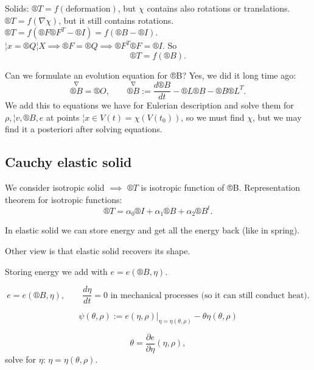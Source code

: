 \documentclass[12pt]{article}					%
\begin{document}
\begin{poznamka}
	Solids: $®T = f(\text{deformation})$, but $\chi$ contains also rotations or translations. $®T = f(\nabla \chi)$, but it still contains rotations. $®T = f(®F ®F^T - ®I) = f(®B - ®I)$. $¦x = ®Q ¦X \implies ®F = ®Q \implies ®F^T ®F = ®I$. So
	$$ ®T = f(®B). $$

	Can we formulate an evolution equation for ®B? Yes, we did it long time ago:
	$$ \overset{\nabla}{®B} = ®O, \qquad \overset{\nabla}{®B} := \frac{d®B}{dt} - ®L®B - ®B®L^T. $$
	We add this to equations we have for Eulerian description and solve them for $\rho, ¦v, ®B, e$ at points $¦x \in V(t) = \chi(V(t_0))$, so we must find $\chi$, but we may find it a posteriori after solving equations.
\end{poznamka}


\subsection{Cauchy elastic solid}
\begin{poznamka}
	We consider isotropic solid $\implies$ $®T$ is isotropic function of ®B. Representation theorem for isotropic functions:
	$$ ®T = \alpha_0®I + \alpha_1 ®B + \alpha_2 ®B^t. $$
\end{poznamka}

\begin{definice}
	In elastic solid we can store energy and get all the energy back (like in spring).

	Other view is that elastic solid recovers its shape.

	Storing energy we add with $e = e(®B, \eta)$.
\end{definice}

\begin{definice}
	$$ e = e(®B, \eta), \qquad \frac{d\eta}{dt} = 0 \text{ in mechanical processes (so it can still conduct heat).} $$
\end{definice}

\begin{definice}
	$$ \psi(\theta, \rho) := e(\eta, \rho)|_{\eta = \eta(\theta, \rho)} - \theta \eta(\theta, \rho) $$
	
	\begin{poznamkain}
		$$ \theta = \frac{\partial e}{\partial \eta}(\eta, \rho), $$
		solve for $\eta$: $\eta = \eta(\theta, \rho)$.
	\end{poznamkain}
\end{definice}
\end{document}
